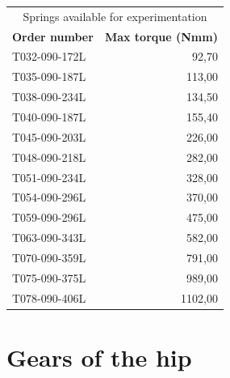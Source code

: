 \begin{appendices}
        \begin{table}[htbp]
        \centering
        \begin{tabular}{l|r}
        \multicolumn{2}{c}{\Large Springs available for experimentation} \\
        \multicolumn{1}{c}{\textbf{Order number}} & \multicolumn{1}{c|}{\textbf{Max torque (Nmm)}} \\ \hline
        T032-090-172L & 92,70   \\ \hline
        T035-090-187L & 113,00  \\ \hline
        T038-090-234L  & 134,50 \\ \hline
        T040-090-187L & 155,40  \\ \hline
        T045-090-203L & 226,00  \\ \hline
        T048-090-218L & 282,00  \\ \hline
        T051-090-234L & 328,00  \\ \hline
        T054-090-296L & 370,00  \\ \hline
        T059-090-296L & 475,00  \\ \hline
        T063-090-343L & 582,00  \\ \hline
        T070-090-359L & 791,00  \\ \hline
        T075-090-375L & 989,00  \\ \hline
        T078-090-406L & 1102,00 \\ 
        \end{tabular}
        \label{tab:available_springs_2}
        \end{table}


    \section{Gears of the hip}
    \label{app:hip_gears}


\end{appendices}
